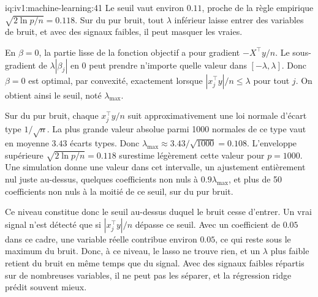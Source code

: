 \begin{solution}{iq:iv1:machine-learning:41}
Le seuil vaut environ $0.11$, proche de la règle empirique $\sqrt{2\ln p/n} = 0.118$. Sur du pur bruit, tout $\lambda$ inférieur laisse entrer des variables de bruit, et avec des signaux faibles, il peut masquer les vraies.

En $\beta = 0$, la partie lisse de la fonction objectif a pour gradient $-X^\top y/n$. Le sous-gradient de $\lambda|\beta_j|$ en 0 peut prendre n'importe quelle valeur dans $[-\lambda, \lambda]$. Donc $\beta = 0$ est optimal, par convexité, exactement lorsque $|x_j^\top y|/n \le \lambda$ pour tout $j$. On obtient ainsi le seuil, noté $\lambda_{\max}$.

Sur du pur bruit, chaque $x_j^\top y/n$ suit approximativement une loi normale d'écart type $1/\sqrt{n}$. La plus grande valeur absolue parmi 1000 normales de ce type vaut en moyenne $3.43$ écarts types. Donc $\lambda_{\max} \approx 3.43/\sqrt{1000} = 0.108$. L'enveloppe supérieure $\sqrt{2\ln p/n} = 0.118$ surestime légèrement cette valeur pour $p = 1000$. Une simulation donne une valeur dans cet intervalle, un ajustement entièrement nul juste au-dessus, quelques coefficients non nuls à $0.9\lambda_{\max}$, et plus de 50 coefficients non nuls à la moitié de ce seuil, sur du pur bruit.

Ce niveau constitue donc le seuil au-dessus duquel le bruit cesse d'entrer. Un vrai signal n'est détecté que si $|x_j^\top y|/n$ dépasse ce seuil. Avec un coefficient de $0.05$ dans ce cadre, une variable réelle contribue environ $0.05$, ce qui reste sous le maximum du bruit. Donc, à ce niveau, le lasso ne trouve rien, et un $\lambda$ plus faible retient du bruit en même temps que du signal. Avec des signaux faibles répartis sur de nombreuses variables, il ne peut pas les séparer, et la régression ridge prédit souvent mieux.



\end{solution}

